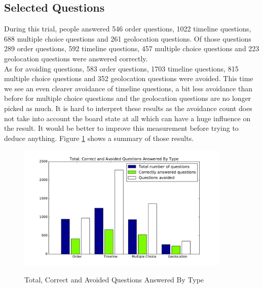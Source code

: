 \subsection{Selected Questions}
During this trial, people answered 546 order questions, 1022 timeline questions, 688 multiple choice questions and 261 geolocation questions. Of those questions 289 order questions, 592 timeline questions, 457 multiple choice questions and 223 geolocation questions were answered correctly.\\
As for avoiding questions, 583 order questions, 1703 timeline questions, 815 multiple choice questions and 352 geolocation questions were avoided. This time we see an even clearer avoidance of timeline questions, a bit less avoidance than before for multiple choice questions and the geolocation questions are no longer picked as much. It is hard to interpret these results as the avoidance count does not take into account the board state at all which can have a huge influence on the result. It would be better to improve this measurement before trying to deduce anything. Figure \ref{fig:p2TotCorrectAvoid} shows a summary of those results.
\begin{figure}
\centering
{\includegraphics[width=4in]{images/pilot_2_selected_questions.pdf}}
\caption{Total, Correct and Avoided Questions Answered By Type}
\label{fig:p2TotCorrectAvoid}
\end{figure}
